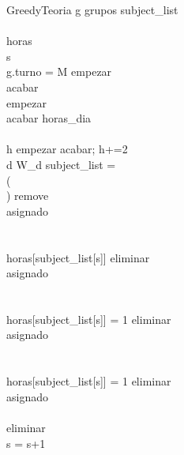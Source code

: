 \begin{pseudocode}{GreedyTeoria}{ }
\label{greedyteoria}
\FOREACH g \in grupos
\BEGIN
  subject\_list \GETS {}\\
  \\
  horas \GETS {}\\
  s \\

  \IF g.turno = M \THEN
  \BEGIN
    empezar  \\
    acabar \GETS {}\\
  \END
  \ELSE 
  \BEGIN
    empezar \GETS {}\\
    acabar \GETS horas\_dia\\
  \END\\

  \FOR h \GETS empezar \TO acabar; h+=2\\
  \BEGIN
    \FOR d  \TO W_d
    \BEGIN
      \IF subject\_list = \emptyset \THEN
      \BREAK\\

      \ELSEIF \NOT ( \AND \\ \;\;\; ) \THEN
      \BEGIN
        remove \GETS \FALSE\\
        asignado \GETS \FALSE\\
      \END\\

      \ELSEIF {} \AND \\ \;\;\; horas[subject\_list[s]]  \THEN
      \BEGIN
        eliminar \GETS {}\\
        asignado \GETS \TRUE\\
      \END\\

      \ELSEIF {} \AND \\ \;\;\; horas[subject\_list[s]] = 1 \THEN
      \BEGIN
        eliminar \GETS {}\\
        asignado \GETS \TRUE\\
      \END\\
      \ELSEIF {} \AND \\ \;\;\; horas[subject\_list[s]] = 1 \THEN
      \BEGIN
        eliminar \GETS {}\\
        asignado \GETS \TRUE\\
      \END\\

      \IF eliminar \THEN {}\\
      \ELSE s = s+1 \\
    \END
  \END 
\END
\end{pseudocode}

